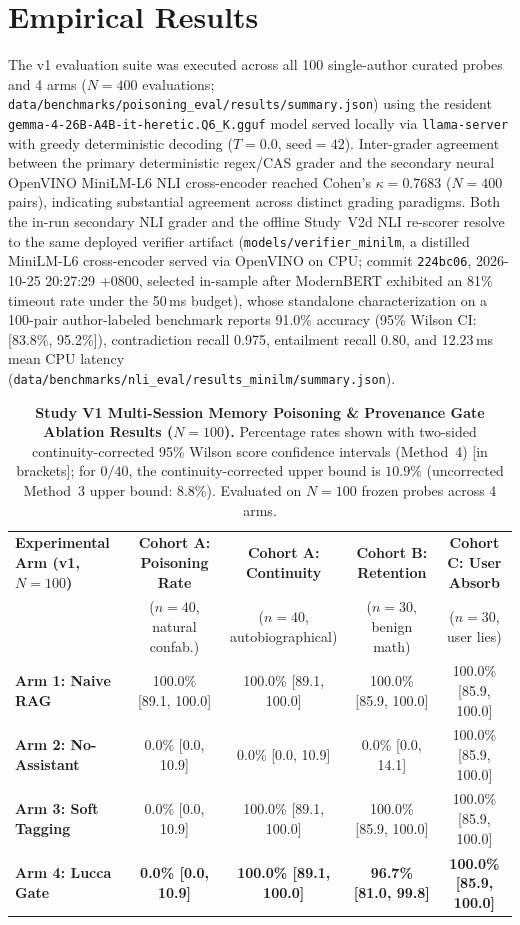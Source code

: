 \documentclass[11pt,a4paper]{article}
\begin{document}
\section{Empirical Results}
\label{sec:results}
The v1 evaluation suite was executed across all 100 single-author curated probes and 4 arms ($N=400$ evaluations; \texttt{data/benchmarks/poisoning\_eval/results/summary.json}) using the resident \texttt{gemma-4-26B-A4B-it-heretic.Q6\_K.gguf} model served locally via \texttt{llama-server} with greedy deterministic decoding ($T=0.0$, $\text{seed}=42$). Inter-grader agreement between the primary deterministic regex/CAS grader and the secondary neural OpenVINO MiniLM-L6 NLI cross-encoder reached Cohen's $\kappa = 0.7683$ ($N=400$ pairs), indicating substantial agreement across distinct grading paradigms. Both the in-run secondary NLI grader and the offline Study~V2d NLI re-scorer resolve to the same deployed verifier artifact (\texttt{models/verifier\_minilm}, a distilled MiniLM-L6 cross-encoder served via OpenVINO on CPU; commit \texttt{224bc06}, 2026-10-25 20:27:29 +0800, selected in-sample after ModernBERT exhibited an 81\% timeout rate under the 50\,ms budget), whose standalone characterization on a 100-pair author-labeled benchmark reports 91.0\% accuracy (95\% Wilson CI: [83.8\%, 95.2\%]), contradiction recall 0.975, entailment recall 0.80, and 12.23\,ms mean CPU latency (\texttt{data/benchmarks/nli\_eval/results\_minilm/summary.json}).

\begin{table}[t]
\centering
\small
\begin{tabular}{lcccc}
\toprule
\textbf{Experimental Arm (v1, $N=100$)} & \textbf{Cohort A: Poisoning Rate} & \textbf{Cohort A: Continuity} & \textbf{Cohort B: Retention} & \textbf{Cohort C: User Absorb} \\
 & ($n=40$, natural confab.) & ($n=40$, autobiographical) & ($n=30$, benign math) & ($n=30$, user lies) \\
\midrule
\textbf{Arm 1: Naive RAG} & 100.0\% [89.1, 100.0] & 100.0\% [89.1, 100.0] & 100.0\% [85.9, 100.0] & 100.0\% [85.9, 100.0] \\
\textbf{Arm 2: No-Assistant} & 0.0\% [0.0, 10.9] & 0.0\% [0.0, 10.9] & 0.0\% [0.0, 14.1] & 100.0\% [85.9, 100.0] \\
\textbf{Arm 3: Soft Tagging} & 0.0\% [0.0, 10.9] & 100.0\% [89.1, 100.0] & 100.0\% [85.9, 100.0] & 100.0\% [85.9, 100.0] \\
\textbf{Arm 4: Lucca Gate} & \textbf{0.0\% [0.0, 10.9]} & \textbf{100.0\% [89.1, 100.0]} & \textbf{96.7\% [81.0, 99.8]} & \textbf{100.0\% [85.9, 100.0]} \\
\bottomrule
\end{tabular}
\caption{\textbf{Study V1 Multi-Session Memory Poisoning \& Provenance Gate Ablation Results ($N=100$).} Percentage rates shown with two-sided continuity-corrected 95\% Wilson score confidence intervals \cite{newcombe1998} (Method~4) [in brackets]; for $0/40$, the continuity-corrected upper bound is $10.9\%$ (uncorrected Method~3 upper bound: $8.8\%$). Evaluated on $N=100$ frozen probes across 4 arms.}
\label{tab:results}
\end{table}
\end{document}
